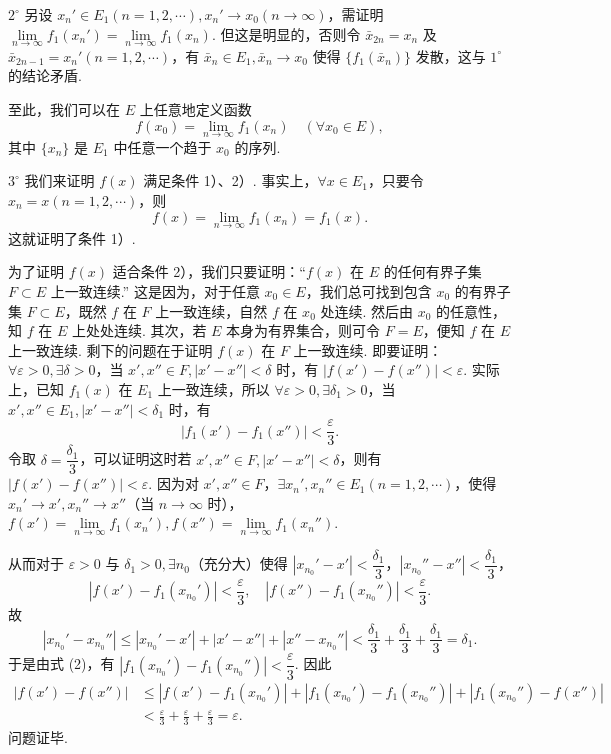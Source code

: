 \documentclass[UTF8, 12pt, fontset=fandol, oneside]{ctexart}
\begin{document}
$2^\circ$ 另设 $x_n'\in E_1(n=1,2,\cdots),x_n'\to x_0(n\to\infty)$，需证明 $\lim\limits_{n\to\infty}f_1(x_n')=\lim\limits_{n\to\infty}f_1(x_n)$. 但这是明显的，否则令 $\bar x_{2n}=x_n$ 及 $\bar x_{2n-1}=x_n'(n=1,2,\cdots)$，有 $\bar x_n\in E_1,\bar x_n\to x_0$ 使得 $\{f_1(\bar x_n)\}$ 发散，这与 $1^\circ$ 的结论矛盾.

至此，我们可以在 $E$ 上任意地定义函数
\[
  f(x_0)=\lim_{n\to\infty}f_1(x_n)\quad(\forall x_0\in E), \tag{1}
\]
其中 $\{x_n\}$ 是 $E_1$ 中任意一个趋于 $x_0$ 的序列.

$3^\circ$ 我们来证明 $f(x)$ 满足条件 1）、2）. 事实上，$\forall x\in E_1$，只要令 $x_n=x(n=1,2,\cdots)$，则
\[
  f(x)=\lim_{n\to\infty}f_1(x_n)=f_1(x).
\]
这就证明了条件 1）.

为了证明 $f(x)$ 适合条件 2），我们只要证明：“$f(x)$ 在 $E$ 的任何有界子集 $F\subset E$ 上一致连续.” 这是因为，对于任意 $x_0\in E$，我们总可找到包含 $x_0$ 的有界子集 $F\subset E$，既然 $f$ 在 $F$ 上一致连续，自然 $f$ 在 $x_0$ 处连续. 然后由 $x_0$ 的任意性，知 $f$ 在 $E$ 上处处连续. 其次，若 $E$ 本身为有界集合，则可令 $F=E$，便知 $f$ 在 $E$ 上一致连续. 剩下的问题在于证明 $f(x)$ 在 $F$ 上一致连续. 即要证明：$\forall\varepsilon>0,\exists\delta>0$，当 $x',x''\in F,|x'-x''|<\delta$ 时，有 $|f(x')-f(x'')|<\varepsilon$. 实际上，已知 $f_1(x)$ 在 $E_1$ 上一致连续，所以 $\forall\varepsilon>0,\exists\delta_1>0$，当 $x',x''\in E_1,|x'-x''|<\delta_1$ 时，有
\[
  |f_1(x')-f_1(x'')|<\frac\varepsilon3. \tag{2}
\]
令取 $\delta=\dfrac{\delta_1}{3}$，可以证明这时若 $x',x''\in F,|x'-x''|<\delta$，则有 $|f(x')-f(x'')|<\varepsilon$. 因为对 $x',x''\in F$，$\exists x_n',x_n''\in E_1(n=1,2,\cdots)$，使得 $x_n'\to x',x_n''\to x''$（当 $n\to\infty$ 时），$f(x')=\lim\limits_{n\to\infty}f_1(x_n'),f(x'')=\lim\limits_{n\to\infty}f_1(x_n'')$.

从而对于 $\varepsilon>0$ 与 $\delta_1>0,\exists n_0$（充分大）使得 $|x_{n_0}'-x'|<\dfrac{\delta_1}{3}$，$|x_{n_0}''-x''|<\dfrac{\delta_1}{3}$，
\[
  |f(x')-f_1(x_{n_0}')|<\frac\varepsilon3,\quad
  |f(x'')-f_1(x_{n_0}'')|<\frac\varepsilon3.
\]
故
\[
  |x_{n_0}'-x_{n_0}''|\le |x_{n_0}'-x'|+|x'-x''|+|x''-x_{n_0}''|
  <\frac{\delta_1}{3}+\frac{\delta_1}{3}+\frac{\delta_1}{3}=\delta_1.
\]
于是由式 (2)，有 $|f_1(x_{n_0}')-f_1(x_{n_0}'')|<\dfrac\varepsilon3$. 因此
\[
\begin{aligned}
|f(x')-f(x'')|
&\le |f(x')-f_1(x_{n_0}')|+|f_1(x_{n_0}')-f_1(x_{n_0}'')|+|f_1(x_{n_0}'')-f(x'')|\\
&<\frac\varepsilon3+\frac\varepsilon3+\frac\varepsilon3=\varepsilon.
\end{aligned}
\]
问题证毕.
\end{document}
